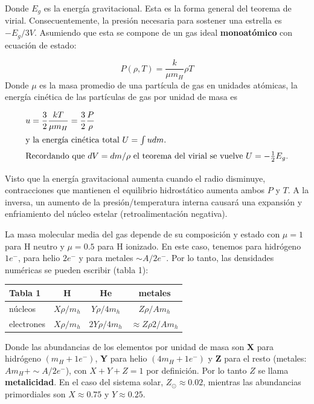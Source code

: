 \documentclass[11pt,letterpaper]{article}
\begin{document}
Donde $E_g$ es la energía gravitacional. Esta es la forma general del teorema de virial. Consecuentemente, la presión necesaria para sostener una estrella es $-E_g/3V$.
Asumiendo que esta se compone de un gas ideal \textbf{monoatómico} con ecuación de estado:

\begin{equation}
    P(\rho , T) = \frac{k}{\mu m_H} \rho T
\end{equation}
Donde $\mu$ es la masa promedio de una partícula de gas en unidades atómicas, la energía cinética de las partículas de gas por unidad de masa es

\begin{align}
    u &= \frac{3}{2} \frac{kT}{\mu m_H} = \frac{3}{2} \frac{P}{\rho} \\
    \intertext{y la energía cinética total $U = \int udm$.}
    \intertext{Recordando que $dV = dm/ \rho $ el teorema del virial se vuelve $U = -\frac{1}{2}E_g$.}
\end{align}

Visto que la energía gravitacional aumenta cuando el radio disminuye, contracciones que mantienen el equilibrio hidrostático aumenta ambos $P$ y $T$. A la inversa, un aumento de la presión/temperatura interna causará una expansión y enfriamiento del núcleo estelar (retroalimentación negativa).

La masa molecular media del gas depende de su composición y estado con $\mu = 1$ para H neutro y $\mu = 0.5$ para H ionizado. En este caso, tenemos para hidrógeno $1e^-$, para helio $2e^-$ y para metales $\sim A/2 e^-$. Por lo tanto, las densidades numéricas se pueden escribir (tabla 1):

\begin{table}[H]
\centering
\renewcommand{\arraystretch}{1.5} %
\begin{tabular}{|l|c|c|c|}
\hline
\textbf{Tabla 1} & \textbf{H} & \textbf{He} & \textbf{metales} \\ \hline
núcleos & \(X\rho/m_h\) & \(Y\rho/4m_h\) & \(Z\rho/Am_h\) \\ \hline
electrones & \(X\rho/m_h\) & \(2Y\rho/4m_h\) & \(\approx Z\rho 2/Am_h\) \\ \hline
\end{tabular}
\end{table}

Donde las abundancias de los elementos por unidad de masa son \textbf{X} para hidrógeno $(m_H + 1e^-)$, \textbf{Y} para helio $(4m_H + 1e^-)$ y \textbf{Z} para el resto (metales: $Am_H + \sim A/2e^-$), con $X+Y+Z = 1$ por definición. Por lo tanto $Z$ se llama \textbf{metalicidad}. En el caso del sistema solar, $Z_\odot \approx 0.02$, mientras las abundancias primordiales son $X\approx 0.75$ y $Y \approx 0.25$.
\end{document}
